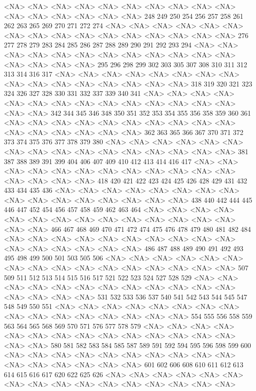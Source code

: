 \documentclass{article}
\begin{document}
\begin{Schunk}
\begin{Soutput}
<NA> <NA> <NA> <NA> <NA> <NA> <NA> <NA> <NA> <NA> <NA> <NA> <NA> <NA> <NA> <NA> 
 248  249  250  254  256  257  258  261  262  263  265  269  270  271  272  274 
<NA> <NA> <NA> <NA> <NA> <NA> <NA> <NA> <NA> <NA> <NA> <NA> <NA> <NA> <NA> <NA> 
 276  277  278  279  283  284  285  286  287  288  289  290  291  292  293  294 
<NA> <NA> <NA> <NA> <NA> <NA> <NA> <NA> <NA> <NA> <NA> <NA> <NA> <NA> <NA> <NA> 
 295  296  298  299  302  303  305  307  308  310  311  312  313  314  316  317 
<NA> <NA> <NA> <NA> <NA> <NA> <NA> <NA> <NA> <NA> <NA> <NA> <NA> <NA> <NA> <NA> 
 318  319  320  321  323  324  326  327  328  330  331  332  337  339  340  341 
<NA> <NA> <NA> <NA> <NA> <NA> <NA> <NA> <NA> <NA> <NA> <NA> <NA> <NA> <NA> <NA> 
 342  344  345  346  348  350  351  352  353  354  355  356  358  359  360  361 
<NA> <NA> <NA> <NA> <NA> <NA> <NA> <NA> <NA> <NA> <NA> <NA> <NA> <NA> <NA> <NA> 
 362  363  365  366  367  370  371  372  373  374  375  376  377  378  379  380 
<NA> <NA> <NA> <NA> <NA> <NA> <NA> <NA> <NA> <NA> <NA> <NA> <NA> <NA> <NA> <NA> 
 381  387  388  389  391  399  404  406  407  409  410  412  413  414  416  417 
<NA> <NA> <NA> <NA> <NA> <NA> <NA> <NA> <NA> <NA> <NA> <NA> <NA> <NA> <NA> <NA> 
 418  420  421  422  423  424  425  426  428  429  431  432  433  434  435  436 
<NA> <NA> <NA> <NA> <NA> <NA> <NA> <NA> <NA> <NA> <NA> <NA> <NA> <NA> <NA> <NA> 
 438  440  442  444  445  446  447  452  454  456  457  458  459  462  463  464 
<NA> <NA> <NA> <NA> <NA> <NA> <NA> <NA> <NA> <NA> <NA> <NA> <NA> <NA> <NA> <NA> 
 466  467  468  469  470  471  472  474  475  476  478  479  480  481  482  484 
<NA> <NA> <NA> <NA> <NA> <NA> <NA> <NA> <NA> <NA> <NA> <NA> <NA> <NA> <NA> <NA> 
 486  487  488  489  490  491  492  493  495  498  499  500  501  503  505  506 
<NA> <NA> <NA> <NA> <NA> <NA> <NA> <NA> <NA> <NA> <NA> <NA> <NA> <NA> <NA> <NA> 
 507  509  511  512  513  514  515  516  517  521  522  523  524  527  528  529 
<NA> <NA> <NA> <NA> <NA> <NA> <NA> <NA> <NA> <NA> <NA> <NA> <NA> <NA> <NA> <NA> 
 531  532  533  536  537  540  541  542  543  544  545  547  548  549  550  551 
<NA> <NA> <NA> <NA> <NA> <NA> <NA> <NA> <NA> <NA> <NA> <NA> <NA> <NA> <NA> <NA> 
 554  555  556  558  559  563  564  565  568  569  570  571  576  577  578  579 
<NA> <NA> <NA> <NA> <NA> <NA> <NA> <NA> <NA> <NA> <NA> <NA> <NA> <NA> <NA> <NA> 
 580  581  582  583  584  585  587  589  591  592  594  595  596  598  599  600 
<NA> <NA> <NA> <NA> <NA> <NA> <NA> <NA> <NA> <NA> <NA> <NA> <NA> <NA> <NA> <NA> 
 601  602  606  608  610  611  612  613  614  615  616  617  620  622  625  626 
<NA> <NA> <NA> <NA> <NA> <NA> <NA> <NA> <NA> <NA> <NA> <NA> <NA> <NA> <NA> <NA> 

\end{Soutput}
\end{Schunk}
\end{document}

